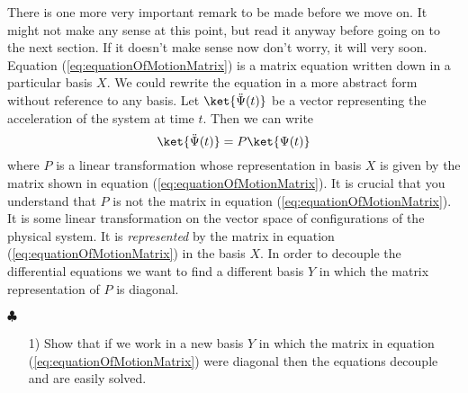 There is one more very important remark to be made before we move on.
It might not make any sense at this point, but read it anyway before going on to the next section.
If it doesn't make sense now don't worry, it will very soon.
Equation (\ref{eq:equationOfMotionMatrix}) is a matrix equation written down in a particular basis $X$.
We could rewrite the equation in a more abstract form without reference to any basis.
Let $\ket{\ddot{\Psi}(t)}$ be a vector representing the acceleration of the system at time $t$.
Then we can write
\begin{equation}\label{eq:equationOfMotionAbstract}
\ket{\ddot{\Psi}(t)} = P \ket{\Psi (t)}
\end{equation}
where $P$ is a linear transformation whose representation in basis $X$ is given by the matrix shown in equation (\ref{eq:equationOfMotionMatrix}).
It is crucial that you understand that $P$ is not the matrix in equation (\ref{eq:equationOfMotionMatrix}).
It is some linear transformation on the vector space of configurations of the physical system.
It is \emph{represented} by the matrix in equation (\ref{eq:equationOfMotionMatrix}) in the basis $X$.
In order to decouple the differential equations we want to find a different basis $Y$ in which the matrix representation of $P$ is diagonal.
\begin{flushright} $\clubsuit$ \end{flushright}

\begin{itemize}
\item[1)] Show that if we work in a new basis $Y$ in which the matrix in equation (\ref{eq:equationOfMotionMatrix}) were diagonal then the equations decouple and are easily solved.
\end{itemize}

